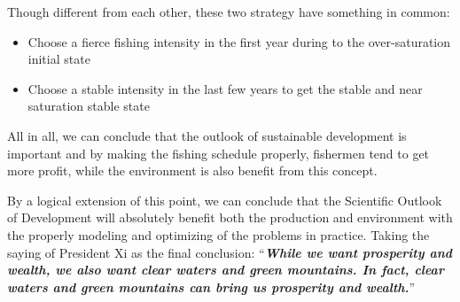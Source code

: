 \documentclass{IEEEtran}
\begin{document}
Though different from each other, these two strategy have something in common:

\begin{itemize}
    \item {Choose a fierce fishing intensity in the first year during to the over-saturation initial state}
    \item {Choose a stable intensity in the last few years to get the stable and near saturation stable state}
\end{itemize}

All in all, we can conclude that the outlook of sustainable development is important and by making the fishing schedule properly, fishermen tend to get more profit, while the environment is also benefit from this concept.

By a logical extension of this point, we can conclude that the Scientific Outlook of Development will absolutely benefit both the production and environment with the properly modeling and optimizing of the problems in practice. Taking the saying of President Xi as the final conclusion: ``\textbf{\textit{While we want prosperity and wealth, we also want clear waters and green mountains. In fact, clear waters and green mountains can bring us prosperity and wealth.}}''



\end{document}

